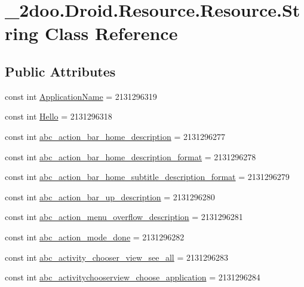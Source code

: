 \hypertarget{class__2doo_1_1_droid_1_1_resource_1_1_string}{
\section{\_\-2doo.Droid.Resource.Resource.String Class Reference}
\label{class__2doo_1_1_droid_1_1_resource_1_1_string}
}
\subsection*{Public Attributes}
\begin{CompactItemize}
\item 
const int \hyperlink{class__2doo_1_1_droid_1_1_resource_1_1_string_53848ea73789ceb2b79ba424a6470279}{ApplicationName} = 2131296319
\item 
const int \hyperlink{class__2doo_1_1_droid_1_1_resource_1_1_string_c28de261fc5963d8aba54c83157abd40}{Hello} = 2131296318
\item 
const int \hyperlink{class__2doo_1_1_droid_1_1_resource_1_1_string_b4bf0d0c18b57df753b18677f55aa11a}{abc\_\-action\_\-bar\_\-home\_\-description} = 2131296277
\item 
const int \hyperlink{class__2doo_1_1_droid_1_1_resource_1_1_string_10d1d56c3b197dc3fd50cc0f94731577}{abc\_\-action\_\-bar\_\-home\_\-description\_\-format} = 2131296278
\item 
const int \hyperlink{class__2doo_1_1_droid_1_1_resource_1_1_string_c444cc380f7dbc35f063abacb2b0e42d}{abc\_\-action\_\-bar\_\-home\_\-subtitle\_\-description\_\-format} = 2131296279
\item 
const int \hyperlink{class__2doo_1_1_droid_1_1_resource_1_1_string_10c0d40950baabdc5212d0dfba79e55f}{abc\_\-action\_\-bar\_\-up\_\-description} = 2131296280
\item 
const int \hyperlink{class__2doo_1_1_droid_1_1_resource_1_1_string_cff20e5c4df2759e46a6f9e276680543}{abc\_\-action\_\-menu\_\-overflow\_\-description} = 2131296281
\item 
const int \hyperlink{class__2doo_1_1_droid_1_1_resource_1_1_string_d4384c93e4bcd65629038ea21d188270}{abc\_\-action\_\-mode\_\-done} = 2131296282
\item 
const int \hyperlink{class__2doo_1_1_droid_1_1_resource_1_1_string_e56872eff0fdcb5301a64c166dd668bd}{abc\_\-activity\_\-chooser\_\-view\_\-see\_\-all} = 2131296283
\item 
const int \hyperlink{class__2doo_1_1_droid_1_1_resource_1_1_string_b7d84db64a9d9a05135a17b16c13dd40}{abc\_\-activitychooserview\_\-choose\_\-application} = 2131296284

\end{CompactItemize}
